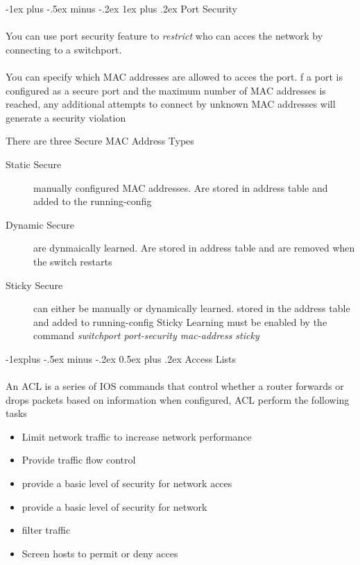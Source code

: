 \documentclass[10pt,landscape]{article}
\makeatletter
\renewcommand{\subsection}{\@startsection{subsection}{2}{0mm}%
                                {-1explus -.5ex minus -.2ex}%
                                {0.5ex plus .2ex}%
                                {\normalfont\normalsize\bfseries}}
\renewcommand{\subsubsection}{\@startsection{subsubsection}{3}{0mm}%
                                {-1ex plus -.5ex minus -.2ex}%
                                {1ex plus .2ex}%
                                {\normalfont\small\bfseries}}
\makeatother
\begin{document}
\begin{multicols}{3}
\subsubsection{Port Security}
\paragraph{}
You can use port security feature to \textit{restrict} who can acces the network by connecting to a switchport.
\paragraph{}
You can specify which MAC addresses are allowed to acces the port. f a port is configured as a secure port and the maximum number of MAC addresses is reached, any additional attempts to connect by unknown MAC addresses will generate a security violation

There are three Secure MAC Address Types
\begin{description}
	\item[Static Secure ] manually configured MAC addresses. Are stored in address table and added to the running-config
	\item[Dynamic Secure] are dynmaically learned. Are stored in address table and are removed when the switch restarts
	\item[Sticky Secure] can either be manually or dynamically learned. stored in the address table and added to running-config Sticky Learning must be enabled by the command \textit{switchport port-security mac-address sticky}
\end{description}

\subsection{Access Lists}
\paragraph{}
An ACL is a series of IOS commands that control whether a router forwards or drops packets based on information
when configured, ACL perform the following tasks
\begin{itemize}
	\item Limit network traffic to increase network performance
	\item Provide traffic flow control
	\item provide a basic level of security for network acces
	\item provide a basic level of security for network
	\item filter traffic
	\item Screen hosts to permit or deny acces
\end{itemize}

\end{multicols}
\end{document}
